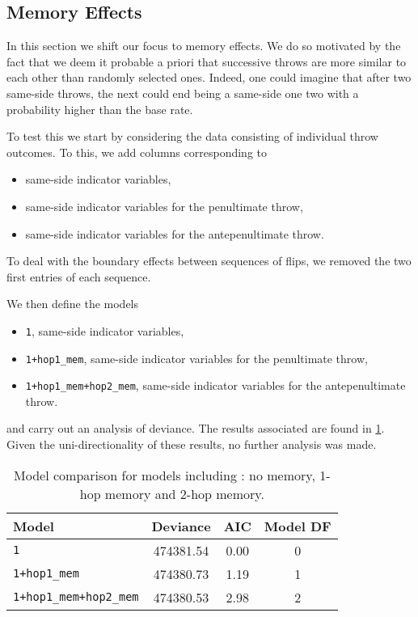 \documentclass[a4paper, 12pt,oneside]{article}
\begin{document}
		\subsection{Memory Effects}
		In this section we shift our focus to memory effects. We do so motivated by the fact that we deem it probable a priori that successive throws are more similar to each other than randomly selected ones. Indeed, one could imagine that after two same-side throws, the next could end being a same-side one two with a probability higher than the base rate. 
		
		To test this we start by considering the data consisting of individual throw outcomes. To this, we add columns corresponding to 
		\begin{itemize}
			\item same-side indicator variables,
			\item same-side indicator variables for the penultimate throw,
			\item same-side indicator variables for the antepenultimate throw.
		\end{itemize}
		To deal with the boundary effects between sequences of flips, we removed the two first entries of each sequence. 
		
		We then define the models 
		\begin{itemize}
			\item \texttt{1}, same-side indicator variables,
			\item \texttt{1+hop1\_mem}, same-side indicator variables for the penultimate throw,
			\item \texttt{1+hop1\_mem+hop2\_mem}, same-side indicator variables for the antepenultimate throw.
		\end{itemize}
		and carry out an analysis of deviance. The results associated are found in \ref{tab:memory-model-comparison}. Given the uni-directionality of these results, no further analysis was made.  
		\begin{table}[htb]
			\centering
			\caption{Model comparison for models including : no memory, 1-hop memory and 2-hop memory.}
			\label{tab:memory-model-comparison}
			\begin{tabular}{lccc}
			\toprule
			Model & Deviance & AIC & Model DF \\
			\midrule
			\texttt{1} & 474381.54 & 0.00 & 0 \\
			\texttt{1+hop1\_mem} & 474380.73 & 1.19 & 1 \\
			\texttt{1+hop1\_mem+hop2\_mem} & 474380.53 & 2.98 & 2 \\
			\bottomrule
			\end{tabular}
		\end{table}
\end{document}
